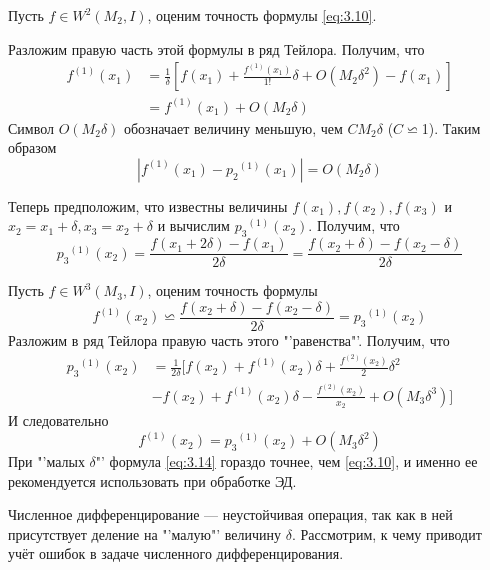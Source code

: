 Пусть $f \in W^2(M_2, I)$, оценим точность формулы \ref{eq:3.10}.

Разложим правую часть этой формулы в ряд Тейлора. Получим, что
\begin{dmath} 
	\begin{aligned}
f^{(1)}(x_1) &= \frac{1}{\delta} [f(x_1) + \frac{f^{(1)}(x_1)}{1!}\delta + O(M_2\delta^2)-f(x_1)] \\
&= f^{(1)}(x_1) + O(M_2 \delta)
	\end{aligned}
\end{dmath}
Символ \textbf{$O(M_2\delta)$} обозначает величину меньшую, чем $CM_2\delta$ ($C\backsimeq$1). Таким образом
\begin{equation}
	|f^{(1)}(x_1) - {p_2}^{(1)}(x_1)| = O(M_2\delta)
\end{equation}

Теперь предположим, что известны величины $f(x_1), f(x_2), f(x_3)$ и $x_2=x_1+\delta, x_3 = x_2 + \delta$ и вычислим  ${p_3}^{(1)}(x_2)$. Получим, что  
\begin{equation}
	{p_3}^{(1)}(x_2) = \frac{f(x_1+2\delta) - f(x_1)}{2\delta} = \frac{f(x_2+\delta) - f(x_2 - \delta)}{2\delta}
\end{equation}

Пусть $f \in W^3(M_3, I)$, оценим точность формулы
\begin{equation} \label{eq:3.14}
	f^{(1)}(x_2) \backsimeq \frac{f(x_2+\delta) - f(x_2 - \delta)}{2\delta} = {p_3}^{(1)}(x_2)
\end{equation}
Разложим в ряд Тейлора правую часть этого "'равенства"'. Получим, что
\begin{dmath} 
	\begin{aligned}
		{p_3}^{(1)}(x_2) &= \frac{1}{2\delta} [f(x_2) + {f^{(1)}(x_2)}\delta + \frac{f^{(2)}(x_2)}{2} \delta^2 \\ &- f(x_2) + f^{(1)}(x_2)\delta - \frac{f^{(2)}(x_2)}{x_2} + O(M_3\delta^3)]
	\end{aligned}
\end{dmath}
И следовательно
\begin{equation}
	f^{(1)}(x_2) =  {p_3}^{(1)}(x_2) + O(M_3\delta^2)
\end{equation}
При "'малых $\delta$"' формула \ref{eq:3.14} гораздо точнее, чем \ref{eq:3.10}, и именно ее рекомендуется использовать при обработке ЭД.

Численное дифференцирование --- неустойчивая операция, так как в ней присутствует деление на "'малую"' величину $\delta$. Рассмотрим, к чему приводит учёт ошибок в задаче численного дифференцирования.

